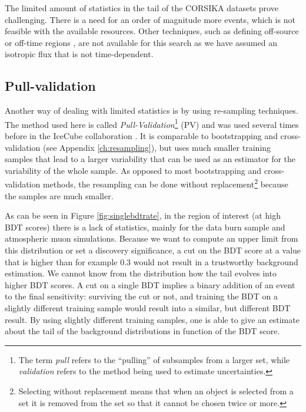 \noindent The limited amount of statistics in the tail of the CORSIKA datasets prove challenging. There is a need for an order of magnitude more events, which is not feasible with the available resources. Other techniques, such as defining off-source or off-time regions \cite{1352676}, are not available for this search as we have assumed an isotropic flux that is not time-dependent.



\subsection{Pull-validation}
\label{subsec:pv}
Another way of dealing with limited statistics is by using re-sampling techniques. The method used here is called \textit{Pull-Validation}\footnote{The term \textit{pull} refers to the ``pulling'' of subsamples from a larger set, while \textit{validation} refers to the method being used to estimate uncertainties.} (PV) and was used several times before in the IceCube collaboration \cite{Aartsen:2016fep,Aartsen:2015exf,scheriauthesis}. It is comparable to bootstrapping and cross-validation (see Appendix \ref{ch:resampling}), but uses much smaller training samples that lead to a larger variability that can be used as an estimator for the variability of the whole sample. As opposed to most bootstrapping and cross-validation methods, the resampling can be done without replacement\footnote{Selecting without replacement means that when an object is selected from a set it is removed from the set so that it cannot be chosen twice or more.} because the samples are much smaller.

As can be seen in Figure \ref{fig:singlebdtrate}, in the region of interest (at high BDT scores) there is a lack of statistics, mainly for the data burn sample and atmospheric muon simulations. Because we want to compute an upper limit from this distribution or set a discovery significance, a cut on the BDT score at a value that is higher than for example 0.3 would not result in a trustworthy background estimation. We cannot know from the distribution how the tail evolves into higher BDT scores. A cut on a single BDT implies a binary addition of an event to the final sensitivity: surviving the cut or not, and training the BDT on a slightly different training sample would result into a similar, but different BDT result. By using slightly different training samples, one is able to give an estimate about the tail of the background distributions in function of the BDT score.\\

